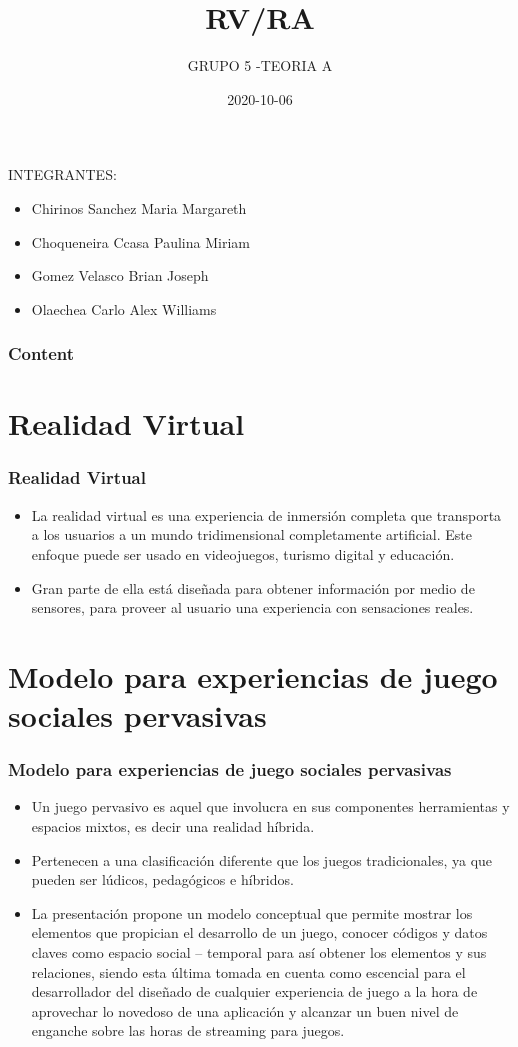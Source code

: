 \documentclass[11pt]{beamer}
\title[RV/RA]{\bf\Huge RV/RA}
\subtitle{GRUPO 5 -TEORIA A}
\institute[UNSA]
{
System Engineering School\\
System Engineering and Informatic Department\\
Production and Services Faculty\\
San Agustin National University of Arequipa
}
\date[2020-10-06]{\scriptsize{2020-10-06}}
\begin{document}
\begin{frame}
\titlepage
\end{frame}

\begin{frame}
\center INTEGRANTES:
\center 

\begin{itemize}
\item Chirinos Sanchez Maria Margareth
\item Choqueneira Ccasa Paulina Miriam
\item Gomez Velasco Brian Joseph
\item Olaechea Carlo Alex Williams
\end{itemize}
\end{frame}


\begin{frame}
\frametitle{Content}
\tableofcontents
\end{frame}

\section{Realidad Virtual}
\begin{frame}
\frametitle{Realidad Virtual}
\begin{itemize}
\item La realidad virtual es una experiencia de inmersión completa que transporta a los usuarios a un mundo tridimensional completamente artificial. Este enfoque puede ser usado en videojuegos, turismo digital y educación.
\item Gran parte de ella está diseñada para obtener información por medio de sensores, para proveer al usuario una experiencia con sensaciones reales. 
\end{itemize}
\end{frame}


\section{Modelo para experiencias de juego sociales pervasivas}
\begin{frame}
\frametitle{Modelo para experiencias de juego sociales pervasivas}
\begin{itemize}
\item Un juego pervasivo es aquel que involucra en sus componentes herramientas y espacios mixtos, es decir una realidad híbrida.
\item Pertenecen a una clasificación diferente que los juegos tradicionales, ya que pueden ser lúdicos, pedagógicos e híbridos.
\item La presentación propone un modelo conceptual
que permite mostrar los elementos que propician el desarrollo de un juego, conocer códigos y datos claves como espacio social – temporal
para así obtener los elementos y sus relaciones, siendo esta última tomada en cuenta como escencial para el desarrollador del diseñado de
cualquier experiencia de juego a la hora de aprovechar lo novedoso
de  una aplicación y alcanzar un buen nivel de enganche sobre las horas de streaming para juegos. 
\end{itemize}
\end{frame}
\end{document}
